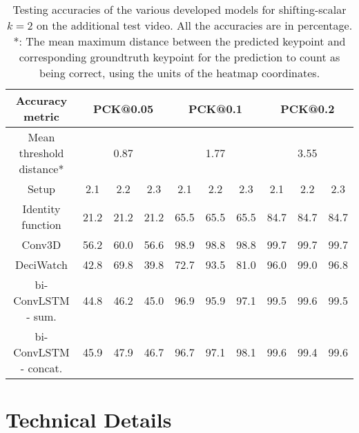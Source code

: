 \documentclass[./main.tex]{subfiles}
\begin{document}
\begin{table}[htbp]
    \begin{tabular}{c||ccc|ccc|ccc}
        \hline
        Accuracy metric & \multicolumn{3}{c}{PCK@0.05} & \multicolumn{3}{c}{PCK@0.1} & \multicolumn{3}{c}{PCK@0.2} \\
        \hline
        Mean threshold distance* & \multicolumn{3}{c}{0.87} & \multicolumn{3}{c}{1.77} & \multicolumn{3}{c}{3.55} \\
        \hline
        Setup & 2.1 & 2.2 & 2.3 & 2.1 & 2.2 & 2.3 & 2.1 & 2.2 & 2.3 \\
        \hline
        \hline
        Identity function & 21.2 & 21.2 & 21.2 & 65.5 & 65.5 & 65.5 & 84.7 & 84.7 & 84.7 \\
        Conv3D & 56.2 & 60.0 & 56.6 & 98.9 & 98.8 & 98.8 & 99.7 & 99.7 & 99.7 \\
        DeciWatch & 42.8 & 69.8 & 39.8 & 72.7 & 93.5 & 81.0 & 96.0 & 99.0 & 96.8 \\
        bi-ConvLSTM - sum. & 44.8 & 46.2 & 45.0 & 96.9 & 95.9 & 97.1 & 99.5 & 99.6 & 99.5 \\
        bi-ConvLSTM - concat. & 45.9 & 47.9 & 46.7 & 96.7 & 97.1 & 98.1 & 99.6 & 99.4 & 99.6 \\
        \hline
    \end{tabular}
    \caption{Testing accuracies of the various developed models for shifting-scalar $k = 2$ on the additional test video. All the accuracies are in percentage. *: The mean maximum distance between the predicted keypoint and corresponding groundtruth keypoint for the prediction to count as being correct, using the units of the heatmap coordinates.}
    \label{tab:finetune_test_accs_4}
\end{table}

\section{Technical Details}
\end{document}
